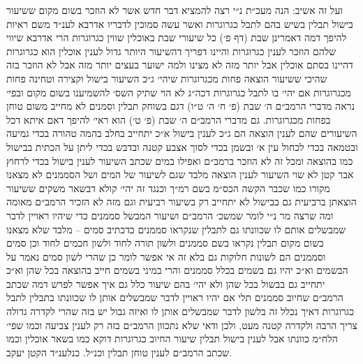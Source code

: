 \documentclass[12pt, openany]{book}
\begin{document}
\begin{multicols}{2}
ועל זה אשיב: הנה מעכ״ת נ״י רצה להמציא דבר חדש אשר לא הוזכר בשום מקום ששיעור בישול תבלין בשיש בהם לתבל כגרוגרות ואשר עשה סמוכין לדבריו אדרבא לענ״ד משם ראיות להיפך דמה דאמרינן שבת (דף פ׳) כל שיעורי שבת באוכלין שווין כגרוגרות הרי אדרבא שיווי שלהם הוזכר לענין כגרוגרות והיינו דפריך דהשיעור היותר גדול לענין אוכלין הוא כגרוגרות דהיינו בסתם אוכלין אבל יותר מזה לא מצינו ולמה ישוער בעצים יותר מזה אבל לא הוזכר בזה שהיכי ששיעור הוצאה פחות מכגרוגרות שיהי׳ ג״כ השיעור בישול וקצירה וטחינה פחות מכגרוגרות אם יהי׳ בו לתבל כגרוגרות דכה״ג לא הוי שתיק השס׳ להשמיענו בשום מקום ובפי׳ נראה מדברי הרמב״ם ה׳ שבת (פ׳ ח׳ ה׳ ט״ו) דגם בשוחק תבלין וסמנים לא מחייב משום טוחן בפחות מכגרוגרות. גם מדברי הרמב״ם ה׳ שבת (פ׳ ט׳) הוא ראי׳ להיפך דאם איתא דכל השיעורים שהם לענין הוצאה הם ג״כ לענין בישול א״כ יתחייב בחלב בהמה טהורה בכדי גמיעה ובטמאה בכדי לכחול עין א׳ ובשמן בכדי לסוך אצבע קטנה ובדבש בכדי ליתן על הכתית בבישול כמו בהוצאה ומכל זה לא הוזכר ברמב״ם ואפילו במים שכתב השיעור לענין בישול בכדי לרחוץ אבר קטן לא שוי השיעור לענין הוצאה מלבד שגם לשיעור של המים ושל הסממנים לא מצאנו מקורו כמו שכבר הקשה הכס״מ בשם רמ״ך וכנגד זה יהי׳ קולא דבשאר משקים ששיעור הוצאתן ברביעית גם בבישול לא יתחייב רק בשיעור רביעית וגם מזה לא הזכיר הרמב״ם מאומה ומה שרצה מר נ״י לומר שמשכ׳ הרמב״ם ושיעור המבשל סממנים כדי שיהיו ראויין לדבר שמבשלים אותם לו שכוונתו גם לתבלין שנקראו סממנים כדכתיב סמים – מלבד שלא מצאנו בשום מקום תבלין נקראו בשם סממנים ולשון תורה לחוד ולשון חכמים לחוד וכן סמים וסממנים הם לשונות חלוקות גם בלא זה אי אפשר לומר כן שהרי לשון סמים נאמר על הבשמים וא״כ יהיו גם בשמים בכלל סממנים והרי במיני בשמים חייב בהוצאה בכל שהן וא״כ יתחייב גם בבשול בכל שהן ולא יהי׳ בהם שיעור כלל גם איך אפשר לפרש דמה שכתב הרמב״ם שחיוב סממנים תלי אם יהיו ראויין לדבר שמבשלים אותן לו שכוונתו בתבלין לתבל כגרוגרות דאיך נכלל זה בלשון לדבר שמבשלים אותן לו ואיזה גבול יש בזה שהרי לקדרה גדולה צריך הרבה ולקדרה קטנה מעט, ולכן ודאי שלא נתכוון הרמב״ם בזה רק לענין צביעה וכמו שפי׳ הלח״מ כוונתו אבל לענין בישול תבלין שיעור החיוב כגרוגרות דוקא כמו בשאר אוכלין וכמו שכתב הרמב״ם לענין טוחן תבלין וכנ״ל. כנלענ״ד הקטן יעקב.\\\vspace{0pt}

\end{multicols}\newpage
\end{document}
